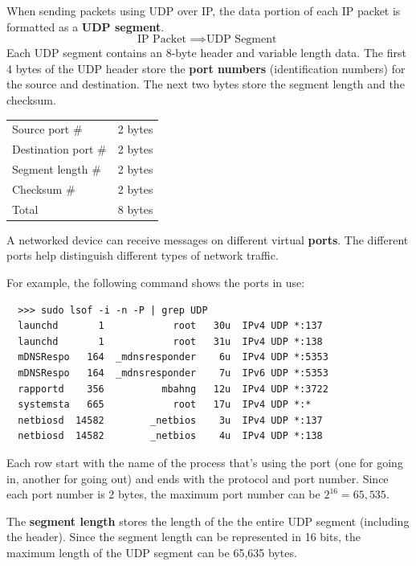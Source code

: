 \documentclass{article}
\begin{document}
  When sending packets using UDP over IP, the data portion of each IP packet is formatted as a \textbf{UDP segment}. 
  \[\text{IP Packet } \implies \text{UDP Segment }\]
  Each UDP segment contains an 8-byte header and variable length data. The first 4 bytes of the UDP header store the \textbf{port numbers} (identification numbers) for the source and destination. The next two bytes store the segment length and the checksum. 
  \begin{center}
  \begin{tabular}{l|l}
      Source port \# & 2 bytes \\
      Destination port \# & 2 bytes \\
      Segment length \# & 2 bytes \\
      Checksum \# & 2 bytes \\
      \hline 
      Total & 8 bytes
  \end{tabular}
  \end{center}

  \begin{definition}
  A networked device can receive messages on different virtual \textbf{ports}. The different ports help distinguish different types of network traffic. 
  \end{definition}

  For example, the following command shows the ports in use: 
  \begin{lstlisting}
  >>> sudo lsof -i -n -P | grep UDP
  launchd       1            root   30u  IPv4 UDP *:137
  launchd       1            root   31u  IPv4 UDP *:138
  mDNSRespo   164  _mdnsresponder    6u  IPv4 UDP *:5353
  mDNSRespo   164  _mdnsresponder    7u  IPv6 UDP *:5353
  rapportd    356          mbahng   12u  IPv4 UDP *:3722
  systemsta   665            root   17u  IPv4 UDP *:*
  netbiosd  14582        _netbios    3u  IPv4 UDP *:137
  netbiosd  14582        _netbios    4u  IPv4 UDP *:138
  \end{lstlisting}
  Each row start with the name of the process that's using the port (one for going in, another for going out) and ends with the protocol and port number. Since each port number is 2 bytes, the maximum port number can be $2^{16} = 65,535$. 

  The \textbf{segment length} stores the length of the the entire UDP segment (including the header). Since the segment length can be represented in 16 bits, the maximum length of the UDP segment can be 65,635 bytes. 
\end{document}
